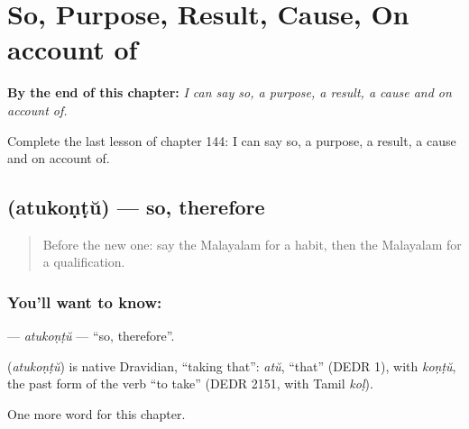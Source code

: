 
\chapter{So, Purpose, Result, Cause, On account of}
\label{ch:ml-so-purpose-result-cause-on-account-of}

\begin{chapteropening}
\textbf{By the end of this chapter:} \emph{I can say so, a purpose, a result, a cause and on account of.}

Complete the last lesson of chapter 144: I can say so, a purpose, a result, a cause and on account of.
\end{chapteropening}

\section[\texorpdfstring{\ml{അതുകൊണ്ട്} (atukoṇṭŭ)}{അതുകൊണ്ട് (atukoṇṭŭ)}]{ (atukoṇṭŭ) — so, therefore}

\label{lesson:ML-C144-atukontu}



\begin{quote}
Before the new one: say the Malayalam for a habit, then the Malayalam for a qualification.
\end{quote}

\subsection*{You'll want to know: }
\textbf{} — \emph{atukoṇṭŭ} — \textquotedblleft{}so, therefore\textquotedblright{}.

\begin{cousinweb}
\textbf{} (\emph{atukoṇṭŭ}) is native Dravidian, \textquotedblleft{}taking that\textquotedblright{}: \emph{atŭ}, \textquotedblleft{}that\textquotedblright{} (DEDR 1), with \emph{koṇṭŭ}, the past form of the verb \textquotedblleft{}to take\textquotedblright{} (DEDR 2151, with Tamil \emph{koḷ}).
\end{cousinweb}

\begin{grammarlens}[title={What you've built}]
One more word for this chapter.
\end{grammarlens}

